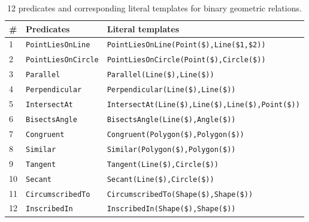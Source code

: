 \begin{table}[ht]
\footnotesize
\centering 
\begin{tabular}{lll}
	\toprule
	\# & \textbf{Predicates} & \textbf{Literal templates} \\
	\midrule
	1 & \texttt{PointLiesOnLine} & \texttt{PointLiesOnLine(Point(\$),Line(\$1,\$2))}\\
	2 & \texttt{PointLiesOnCircle} & \texttt{PointLiesOnCircle(Point(\$),Circle(\$))}\\
	3 & \texttt{Parallel} & \texttt{Parallel(Line(\$),Line(\$))}\\
	4 & \texttt{Perpendicular} & \texttt{Perpendicular(Line(\$),Line(\$))}\\
	5 & \texttt{IntersectAt} & \texttt{IntersectAt(Line(\$),Line(\$),Line(\$),Point(\$))}\\
	6 & \texttt{BisectsAngle} & \texttt{BisectsAngle(Line(\$),Angle(\$))}\\
	7 & \texttt{Congruent} & \texttt{Congruent(Polygon(\$),Polygon(\$))}\\
	8 & \texttt{Similar} & \texttt{Similar(Polygon(\$),Polygon(\$))} \\
	9 & \texttt{Tangent} & \texttt{Tangent(Line(\$),Circle(\$))}\\
    10 & \texttt{Secant} & \texttt{Secant(Line(\$),Circle(\$))}\\
    11 & \texttt{CircumscribedTo} & \texttt{CircumscribedTo(Shape(\$),Shape(\$))}\\
    12 & \texttt{InscribedIn} & \texttt{InscribedIn(Shape(\$),Shape(\$))}\\
	\bottomrule
\end{tabular}
\caption{12 predicates and corresponding literal templates for binary geometric relations.}
\label{appex:predicate4}
\end{table}

